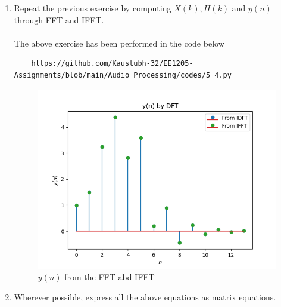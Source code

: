\documentclass[journal,12pt,twocolumn]{IEEEtran}
\theoremstyle{remark}
\begin{document}
\begin{enumerate}[label=\thesection.\arabic*]
\item Repeat the previous exercise by computing $X(k), H(k)$ and $y(n)$ through FFT and 
IFFT.\\
\solution \\
The above exercise has been performed in the code below
\begin{lstlisting}
    https://github.com/Kaustubh-32/EE1205-Assignments/blob/main/Audio_Processing/codes/5_4.py
\end{lstlisting}
\begin{figure}[!ht]
\centering
\includegraphics[width=\columnwidth]{yn_verf_5_4.png}
\caption{$y(n)$ from the FFT abd IFFT}
\label{fig:yndft}
\end{figure}
\item Wherever possible, express all the above equations as matrix equations.


\end{enumerate}
\end{document}
